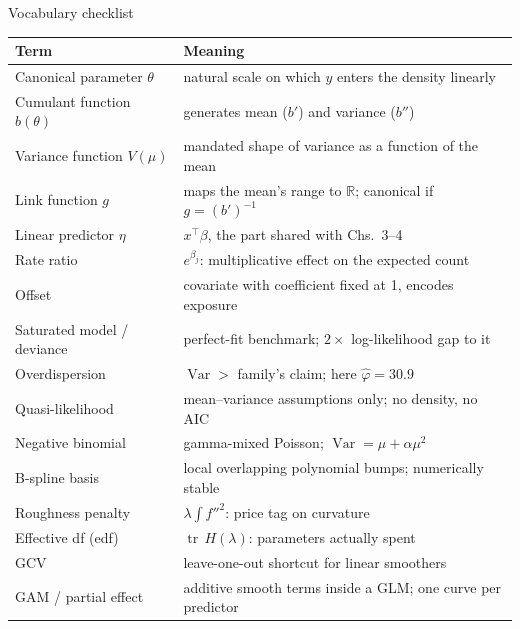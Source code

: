 \documentclass[aspectratio=169,11pt]{beamer}
\begin{document}
\begin{frame}{Vocabulary checklist}
  \footnotesize
  \begin{center}
  \begin{tabular}{@{}ll@{}}
    \toprule
    \textbf{Term} & \textbf{Meaning} \\
    \midrule
    Canonical parameter $\theta$ & natural scale on which $y$ enters the density linearly \\
    Cumulant function $b(\theta)$ & generates mean ($b'$) and variance ($b''$) \\
    Variance function $V(\mu)$ & mandated shape of variance as a function of the mean \\
    Link function $g$ & maps the mean's range to $\mathbb{R}$; canonical if $g=(b')^{-1}$ \\
    Linear predictor $\eta$ & $x^{\top}\beta$, the part shared with Chs.\ 3--4 \\
    Rate ratio & $e^{\beta_j}$: multiplicative effect on the expected count \\
    Offset & covariate with coefficient fixed at 1, encodes exposure \\
    Saturated model / deviance & perfect-fit benchmark; $2\times$ log-likelihood gap to it \\
    Overdispersion & $\operatorname{Var} > $ family's claim; here $\hat\varphi = 30.9$ \\
    Quasi-likelihood & mean--variance assumptions only; no density, no AIC \\
    Negative binomial & gamma-mixed Poisson; $\operatorname{Var}=\mu+\alpha\mu^2$ \\
    B-spline basis & local overlapping polynomial bumps; numerically stable \\
    Roughness penalty & $\lambda\int f''^2$: price tag on curvature \\
    Effective df (edf) & $\operatorname{tr}\,H(\lambda)$: parameters actually spent \\
    GCV & leave-one-out shortcut for linear smoothers \\
    GAM / partial effect & additive smooth terms inside a GLM; one curve per predictor \\
    \bottomrule
  \end{tabular}
  \end{center}
\end{frame}
\end{document}
